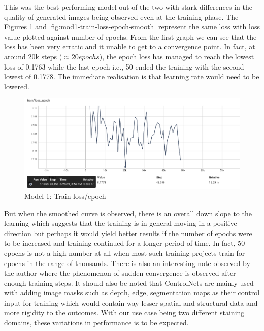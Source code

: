 This was the best performing model out of the two with stark differences in the quality of generated images being observed even at the training phase. The Figures \ref{fig:mod1-train-loss-epoch} and \ref{fig:mod1-train-loss-epoch-smooth} represent the same loss with loss value plotted against number of epochs. From the first graph we can see that the loss has been very erratic and it unable to get to a convergence point. In fact, at around 20k steps ($\approx 20  epochs$), the epoch loss has managed to reach the lowest loss of 0.1763 while the last epoch i.e., 50 ended the training with the second lowest of 0.1778. The immediate realisation is that learning rate would need to be lowered.
\begin{figure}[h]
    \centering
    \includegraphics[width=1\linewidth]{5_Results/figures/var1-train-epoch-loss.png}
    \caption{Model 1: Train loss/epoch}
    \label{fig:mod1-train-loss-epoch}
\end{figure}
But when the smoothed curve is observed, there is an overall down slope to the learning which suggests that the training is in general moving in a positive direction but perhaps it would yield better results if the number of epochs were to be increased and training continued for a longer period of time. In fact, 50 epochs is not a high number at all when most such training projects train for epochs in the range of thousands. There is also an interesting note observed by the author \parencite[Figure 4, p. 5]{Zhang2023AddingModels} where the phenomenon of sudden convergence is observed after enough training steps. It should also be noted that ControlNets are mainly used with adding image masks such as depth, edge, segmentation maps as their control input for training which would contain way lesser spatial and structural data and more rigidity to the outcomes. With our use case being two different staining domains, these variations in performance is to be expected. 
